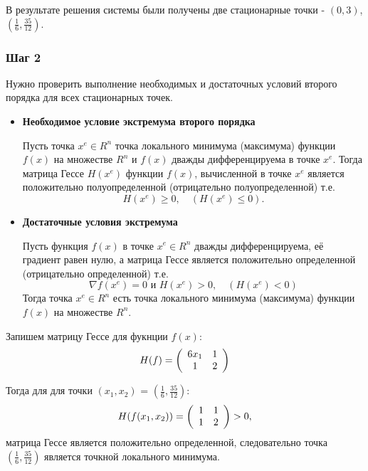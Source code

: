 \documentclass[a4paper, 12pt]{article}   	%
\begin{document}
    В результате решения системы были получены две стационарные точки - $(0, 3)$, $(\frac{1}{6}, \frac{35}{12})$.

\subsubsection{Шаг 2}
    Нужно проверить выполнение необходимых и достаточных условий второго порядка для всех стационарных точек. 
    
    \begin{itemize}
        \item \textbf{Необходимое условие экстремума второго порядка}
        
        Пусть точка $x^e \in R^n$ точка локального минимума (максимума) функции  $f(x)$ на множестве $R^n$ и $f(x)$ дважды дифференцируема в точке $x^e$. Тогда матрица Гессе $H(x^e)$ функции $f(x)$, вычисленной в точке $x^e$ является положительно полуопределенной (отрицательно полуопределенной) т.е. 
        \begin{equation*}
            H(x^e) \geq 0, \quad (H(x^e) \leq 0).
        \end{equation*}
        
        \item \textbf{Достаточные условия экстремума}
        
        Пусть функция $f(x)$ в точке $x^e \in R^n$ дважды дифференцируема, её градиент равен нулю, а матрица Гессе является положительно определенной (отрицательно определенной) т.е. 
		\begin{equation*}
		    \nabla f(x^e) = 0 \text{ и } H(x^e) > 0, \quad (H(x^e) < 0)
		\end{equation*}
        Тогда точка $x^e \in R^n$ есть точка локального минимума (максимума) функции $f(x)$ на множестве $R^n$.
    \end{itemize}

    Запишем матрицу Гессе для фукнции $f(x)$:
    \begin{equation}
        H(f) = 
        \left(
        \begin{array}{c c}
            6x_1 & 1\\
            1 & 2
        \end{array}
        \right)
    \end{equation}
    
    Тогда для для точки $(x_1, x_2)$ = $(\frac{1}{6}, \frac{35}{12})$:
    \begin{equation}
        H(f(x_1, x_2)) = 
        \left(
        \begin{array}{c c}
            1 & 1\\
            1 & 2
        \end{array}
        \right) 
        > 0,
    \end{equation} 
    матрица Гессе является положительно определенной, следовательно точка $(\frac{1}{6}, \frac{35}{12})$ является точкной локального минимума.
    
\end{document}
